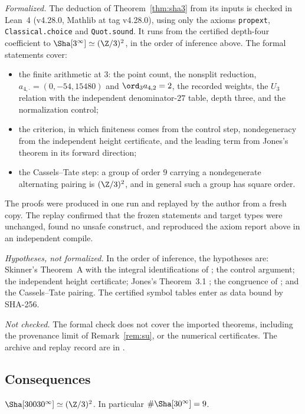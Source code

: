 \begin{remark}\label{rem:a5lean}
\emph{Formalized.} The deduction of Theorem~\ref{thm:sha3} from its inputs is checked in Lean~4 (v4.28.0, Mathlib at tag v4.28.0), using only the axioms \texttt{propext}, \texttt{Classical.choice} and \texttt{Quot.sound}. It runs from the certified depth-four coefficient to $\Sha[3^\infty]\simeq(\Z/3)^2$, in the order of inference above. The formal statements cover:
\begin{itemize}[leftmargin=*]
\item the finite arithmetic at $3$: the point count, the nonsplit reduction, $a_{4,\cdot}=(0,-54,15480)$ and $\ord_3a_{4,2}=2$, the recorded weights, the $U_3$ relation with the independent denominator-$27$ table, depth three, and the normalization control;
\item the criterion, in which finiteness comes from the control step, nondegeneracy from the independent height certificate, and the leading term from Jones's theorem in its forward direction;
\item the Cassels--Tate step: a group of order $9$ carrying a nondegenerate alternating pairing is $(\Z/3)^2$, and in general such a group has square order.
\end{itemize}
The proofs were produced in one run and replayed by the author from a fresh copy. The replay confirmed that the frozen statements and target types were unchanged, found no unsafe construct, and reproduced the axiom report above in an independent compile.

\emph{Hypotheses, not formalized.} In the order of inference, the hypotheses are: Skinner's Theorem~A \cite{skinner} with the integral identifications of \cite{gv}; the control argument; the independent height certificate; Jones's Theorem~3.1 \cite{jones}; the congruence of \cite[Prop.~3.5]{sw}; and the Cassels--Tate pairing. The certified symbol tables enter as data bound by SHA-256.

\emph{Not checked.} The formal check does not cover the imported theorems, including the provenance limit of Remark~\ref{rem:su}, or the numerical certificates. The archive and replay record are in .
\end{remark}

\subsection{Consequences}
\begin{corollary}[\cid{S.P}]\label{cor:small}
$\Sha[30030^\infty]\simeq(\Z/3)^2$. In particular $\#\Sha[30^\infty]=9$.
\end{corollary}

